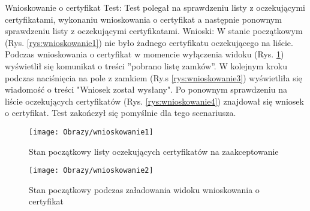 \documentclass[twoside,10pt]{article}
\begin{document}
\begin{enumerate*}
\newpage

\item Wnioskowanie o certyfikat\newline
Test: Test polegał na sprawdzeniu listy z oczekującymi certyfikatami, wykonaniu wnioskowania o certyfikat a następnie ponownym sprawdzeniu listy z oczekującymi certyfikatami.\newline
Wnioski: W stanie początkowym (Rys. \ref{rys:wnioskowanie1}) nie było żadnego certyfikatu oczekującego na liście. Podczas wnioskowania o certyfikat w momencie wyłączenia widoku (Rys. \ref{rys:wnioskowanie2}) wyświetlił się  komunikat o treści ''pobrano listę zamków''. W kolejnym kroku podczas naciśnięcia na pole z zamkiem (Ry.s \ref{rys:wnioskowanie3}) wyświetliła się wiadomość o treści "Wniosek został wysłany". Po ponownym sprawdzeniu na liście oczekujących certyfikatów (Rys. \ref{rys:wnioskowanie4}) znajdował się wniosek o certyfikat. Test zakończył się pomyślnie dla tego scenariusza.
\begin{figure}[ht!]
\centering
\begin{minipage}{0.3\textwidth}
\texttt{[image: Obrazy/wnioskowanie1]}
\caption{Stan początkowy listy oczekujących certyfikatów na zaakceptowanie }
\label{rys:wnioskowanie1}
\end{minipage}
\begin{minipage}{0.3\textwidth}
\texttt{[image: Obrazy/wnioskowanie2]}
\caption{Stan początkowy podczas załadowania widoku wnioskowania o certyfikat}
\label{rys:wnioskowanie2}
\end{minipage}


\end{figure}
\end{enumerate*}
\end{document}
